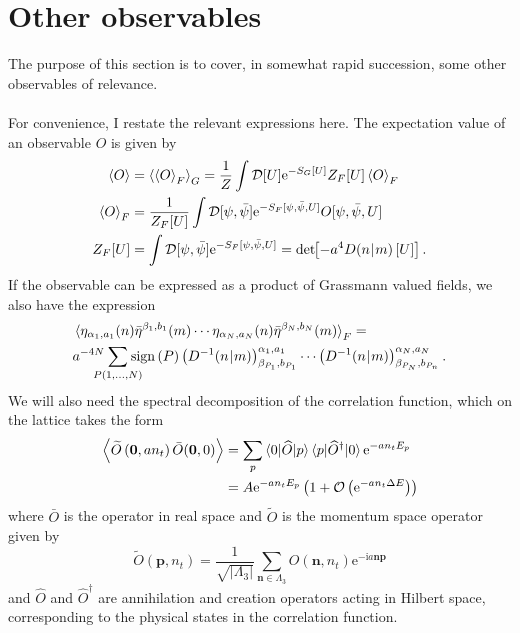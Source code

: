 \documentclass[a4paper,10pt]{book}
\begin{document}
\section{Other observables}
The purpose of this section is to cover, in somewhat rapid succession, some other observables of relevance.\\\\For convenience, I restate the relevant expressions here. The expectation value of an observable $O$ is given by
\begin{equation}\label{eq:exp_val_collection}
\begin{aligned}
\braket{O}&=\braket{\braket{O}_{F}}_G=\frac{1}{Z} \int \mathcal{D}[U] \mathrm{e}^{-S_{G}[U]} Z_{F}[U] \braket{O}_{F}\\
\braket{O}_{F}&=\frac{1}{Z_{F}[U]} \int \mathcal{D}[\psi, \bar{\psi}] \mathrm{e}^{-S_{F}[\psi, \bar{\psi}, U]} O[\psi, \bar{\psi}, U]\\
Z_{F}[U]&=\int \mathcal{D}[\psi, \bar{\psi}] \mathrm{e}^{-S_{F}[\psi, \bar{\psi}, U]}=\operatorname{det}\mkern-5mu\left[ -a^4D(n\mkern-4mu\mid \mkern-4mu m)\left[ U \right] \right].
\end{aligned}
\end{equation}
If the observable can be expressed as a product of Grassmann valued fields, we also have the expression
\begin{equation}\label{eq:new_Wick_Theorem}
\begin{aligned}
&\braket{\eta_{\alpha_1,a_1}(n)\bar{\eta}^{\beta_1,b_1}(m)\cdots\eta_{\alpha_N,a_N}(n)\bar{\eta}^{\beta_N,b_N}(m)}_F = \\&a^{-4N} \mkern-18mu\sum\limits_{P(1,\ldots,N)}\mkern-18mu\operatorname{sign}\left( P \right)\left( D^{-1}(n\mkern-4mu\mid \mkern-4mu m) \right)_{\beta_{P_1},b_{P_1}}^{\alpha_1,a_1}\cdots\left( D^{-1}(n\mkern-4mu\mid \mkern-4mu m) \right)_{\beta_{P_N},b_{P_n}}^{\alpha_N,a_N}.
\end{aligned}
\end{equation}
We will also need the spectral decomposition of the correlation function, which on the lattice takes the form
\begin{equation}\label{eq:corr_function_for_hadron_masses}
\begin{aligned} 
\left\langle\widetilde{O}\left(\mathbf{0}, an_{t}\right) \bar{O}(\mathbf{0}, 0)\right\rangle&=\sum_{p}\braket{0|\widehat{O}| p}\braket{p|\widehat{O}^{\dagger}| 0} \mathrm{e}^{-an_{t} E_{p}}\\
&=A \mathrm{e}^{-a n_{t} E_p}\left(1+\mathcal{O}\left(\mathrm{e}^{-a n_{t} \Delta E}\right)\right)
\end{aligned}
\end{equation}
where $\bar{O}$ is the operator in real space and $\widetilde{O}$ is the momentum space operator given by
\begin{equation}
\widetilde{O}\left(\boldsymbol{p}, n_{t}\right)=\frac{1}{\sqrt{\left|\Lambda_{3}\right|}} \sum_{\boldsymbol{n} \in \Lambda_{3}} O\left(\boldsymbol{n}, n_{t}\right) \mathrm{e}^{-\mathrm{i} a \boldsymbol{n} \boldsymbol{p}}
\end{equation}
and $\widehat{O}$ and $\widehat{O}^{\dagger}$ are annihilation and creation operators acting in Hilbert space, corresponding to the physical states in the correlation function.
\end{document}
